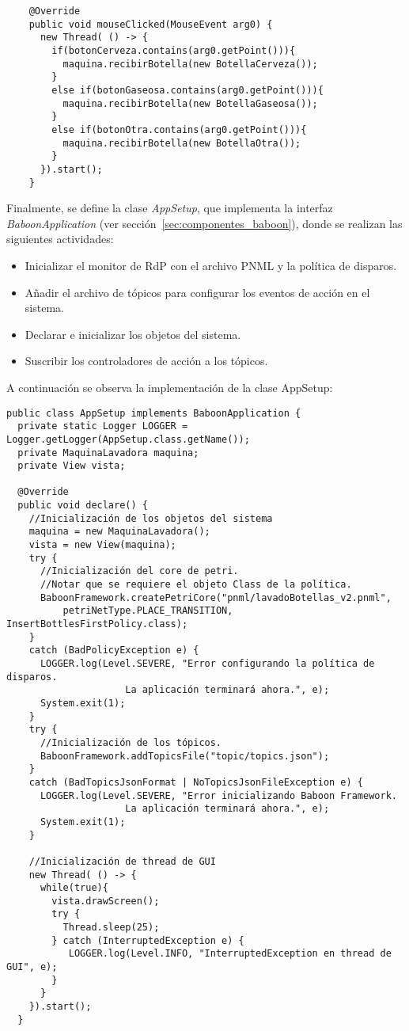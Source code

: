 \begin{verbatim}
    @Override
    public void mouseClicked(MouseEvent arg0) {
      new Thread( () -> {
        if(botonCerveza.contains(arg0.getPoint())){
          maquina.recibirBotella(new BotellaCerveza());
        }
        else if(botonGaseosa.contains(arg0.getPoint())){
          maquina.recibirBotella(new BotellaGaseosa());
        }
        else if(botonOtra.contains(arg0.getPoint())){
          maquina.recibirBotella(new BotellaOtra());
        }
      }).start();
    }
\end{verbatim}


Finalmente, se define la clase \emph{AppSetup}, que implementa la interfaz
\emph{BaboonApplication} (ver sección~\ref{sec:componentes_baboon}), donde se
realizan las siguientes actividades:
\begin{itemize}
  \item Inicializar el monitor de RdP con el archivo PNML y la política de
  disparos.
  \item Añadir el archivo de tópicos para configurar los eventos de acción en
  el sistema.
  \item Declarar e inicializar los objetos del sistema.
  \item Suscribir los controladores de acción a los tópicos.
\end{itemize} 

A continuación se observa la implementación de la clase AppSetup:

\begin{verbatim}
public class AppSetup implements BaboonApplication {
  private static Logger LOGGER = Logger.getLogger(AppSetup.class.getName());
  private MaquinaLavadora maquina;
  private View vista;

  @Override
  public void declare() {
    //Inicialización de los objetos del sistema
    maquina = new MaquinaLavadora();
    vista = new View(maquina);
    try {
      //Inicialización del core de petri.
      //Notar que se requiere el objeto Class de la política.
      BaboonFramework.createPetriCore("pnml/lavadoBotellas_v2.pnml",
          petriNetType.PLACE_TRANSITION, InsertBottlesFirstPolicy.class);
    } 
    catch (BadPolicyException e) {
      LOGGER.log(Level.SEVERE, "Error configurando la política de disparos.
                     La aplicación terminará ahora.", e);
      System.exit(1);
    }
    try {
      //Inicialización de los tópicos.
      BaboonFramework.addTopicsFile("topic/topics.json");
    } 
    catch (BadTopicsJsonFormat | NoTopicsJsonFileException e) {
      LOGGER.log(Level.SEVERE, "Error inicializando Baboon Framework.
                     La aplicación terminará ahora.", e);
      System.exit(1);
    }

    //Inicialización de thread de GUI
    new Thread( () -> {
      while(true){
        vista.drawScreen();
        try {
          Thread.sleep(25);
        } catch (InterruptedException e) {
           LOGGER.log(Level.INFO, "InterruptedException en thread de GUI", e);
        }
      }
    }).start();
  }

\end{verbatim}

